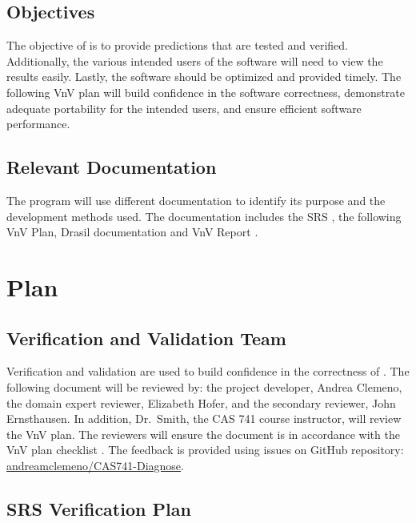 \documentclass[12pt, titlepage]{article}
\begin{document}
\subsection{Objectives}

The objective of \progname{} is to provide predictions that are tested and 
verified. Additionally, the various intended users of the software will need to view the 
results easily. Lastly, the software should be optimized and provided timely. 
The following VnV plan will build confidence in the software correctness, 
demonstrate adequate portability for the intended users, and ensure efficient 
software performance.


\subsection{Relevant Documentation}

The \progname{} program will use different documentation to identify its 
purpose and the development methods used. The documentation includes the SRS 
\citep{SRS}, the following VnV Plan, Drasil documentation \citep{DrasilSRS}
and VnV Report \citep{DiagnoseVNVreport}.



\section{Plan}
	
\subsection{Verification and Validation Team}

Verification and validation are used to build confidence in the correctness of 
\progname{}. The following document will be reviewed by: the project developer, 
Andrea Clemeno, the domain expert reviewer, Elizabeth Hofer, and the secondary 
reviewer, John Ernsthausen. In addition, Dr.\ Smith, the CAS 741 course 
instructor, will review the VnV plan. The reviewers will ensure the document is 
in accordance with the VnV plan checklist \citep{Vnvchecklist}. The feedback 
is provided using issues on GitHub repository: \href{https://github.com/andreamclemeno/CAS741-Diagnose/tree/master/test}{andreamclemeno/CAS741-Diagnose}. 

\subsection{SRS Verification Plan}
\end{document}
